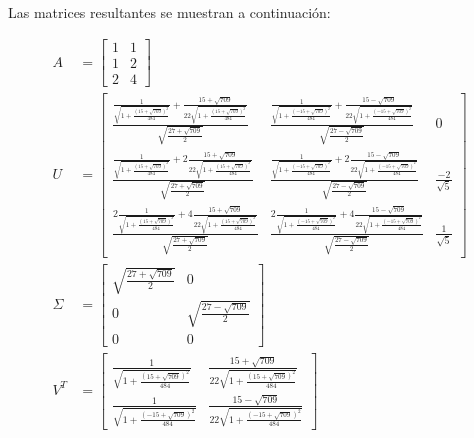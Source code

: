 \documentclass[a4paper, spanish]{article}
\begin{document}
  \paragraph{}
  Las matrices resultantes se muestran a continuación:

  \begin{align}
    A &=
    \begin{bmatrix}
      1 & 1\\
      1 & 2\\
      2 & 4
    \end{bmatrix} \\
    U &=
    \begin{bmatrix}
      \frac{\frac{1}{\sqrt{1 + \frac{(15 + \sqrt{709})^2}{484}}} +
      \frac{15 + \sqrt{709}}{22\sqrt{1 + \frac{(15 + \sqrt{709})^2}{484}}}}{\sqrt{\frac{27 + \sqrt{709}}{2}}} & \frac{\frac{1}{\sqrt{1 + \frac{(- 15 + \sqrt{709})^2}{484}}} + \frac{15 - \sqrt{709}}{22\sqrt{1 + \frac{(- 15 + \sqrt{709})^2}{484}}}}{\sqrt{\frac{27 - \sqrt{709}}{2}}} & 0 \\
      \frac{\frac{1}{\sqrt{1 + \frac{(15 + \sqrt{709})^2}{484}}} +2
      \frac{15 + \sqrt{709}}{22\sqrt{1 + \frac{(15 + \sqrt{709})^2}{484}}}}{\sqrt{\frac{27 + \sqrt{709}}{2}}} & \frac{\frac{1}{\sqrt{1 + \frac{(- 15 + \sqrt{709})^2}{484}}} + 2
      \frac{15 - \sqrt{709}}{22\sqrt{1 + \frac{(- 15 + \sqrt{709})^2}{484}}}}{\sqrt{\frac{27 - \sqrt{709}}{2}}} & \frac{-2}{\sqrt{5}} \\
      \frac{2\frac{1}{\sqrt{1 + \frac{(15 + \sqrt{709})^2}{484}}} +4
      \frac{15 + \sqrt{709}}{22\sqrt{1 + \frac{(15 + \sqrt{709})^2}{484}}}}{\sqrt{\frac{27 + \sqrt{709}}{2}}} & \frac{2\frac{1}{\sqrt{1 + \frac{(- 15 + \sqrt{709})^2}{484}}} +4
      \frac{15 - \sqrt{709}}{22\sqrt{1 + \frac{(- 15 + \sqrt{709})^2}{484}}}}{\sqrt{\frac{27 - \sqrt{709}}{2}}} & \frac{1}{\sqrt{5}}
    \end{bmatrix} \\
    \Sigma &=
    \begin{bmatrix}
      \sqrt{\frac{27 + \sqrt{709}}{2}} & 0 \\
      0 & \sqrt{\frac{27 - \sqrt{709}}{2}} \\
      0 & 0
    \end{bmatrix} \\
    V^T &=
    \begin{bmatrix}
      \frac{1}{\sqrt{1 + \frac{(15 + \sqrt{709})^2}{484}}} &  \frac{15 + \sqrt{709}}{22\sqrt{1 + \frac{(15 + \sqrt{709})^2}{484}}}  \\
      \frac{1}{\sqrt{1 + \frac{(- 15 + \sqrt{709})^2}{484}}} & \frac{15 - \sqrt{709}}{22\sqrt{1 + \frac{(- 15 + \sqrt{709})^2}{484}}}
    \end{bmatrix}
  \end{align}
\end{document}
